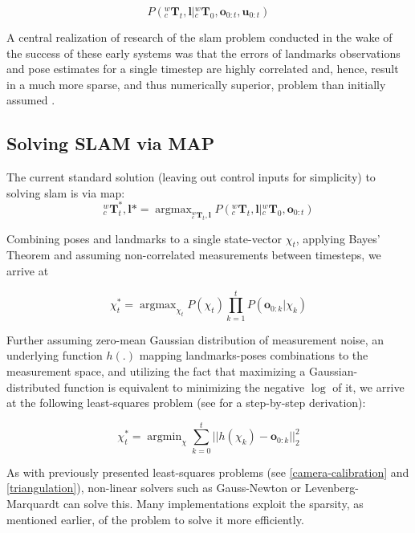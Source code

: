\documentclass[headsepline, hidelinks, footsepline, footinclude=false, oneside, fontsize=11pt, paper=a4, listof=totoc, bibliography=totoc]{scrbook}
\DeclareMathOperator*{\argmax}{argmax}
\DeclareMathOperator*{\argmin}{argmin}
\begin{document}
\begin{equation}
\label{eq:slam-prob-ctrl-input}
P({}^w_c\mathbf{T}_t, \mathbf{l} | {}^w_c\mathbf{T}_0, \mathbf{o}_{0:t}, \mathbf{u}_{0:t})
\end{equation}

A central realization of research of the \gls{slam} problem conducted in the wake of the success of these early systems was that the errors of landmarks observations and pose estimates for a single timestep 
are highly correlated and, hence, result in a much more sparse, and thus numerically superior, problem than initially assumed \cite{cadenaPresentFutureSimultaneous2016}. 

\subsection{Solving SLAM via MAP}
\label{sec:orgc0908ab}
The current standard solution (leaving out control inputs for simplicity) to solving \gls{slam} is via \gls{map}:
\begin{equation}
\label{eq:slam-map}
{}^w_c\mathbf{T}_t^*, \mathbf{l}* = \argmax_{{}^w_c\mathbf{T}_t, \mathbf{l}} P({}^w_c\mathbf{T}_t, \mathbf{l} | {}^w_c\mathbf{T}_0, \mathbf{o}_{0:t})
\end{equation}

Combining poses and landmarks to a single state-vector \(\chi_t\), applying Bayes' Theorem and assuming non-correlated measurements between timesteps, we arrive at 

\begin{equation}
\label{eq:slam-map-2}
\chi_t^* = \argmax_{\chi_t} P(\chi_t) \prod_{k=1}^{t}P(\mathbf{o}_{0:k} | \chi_k)
\end{equation}

Further assuming zero-mean Gaussian distribution of measurement noise, an underlying function \(h(.)\) mapping landmarks-poses combinations to the measurement space, and utilizing the fact that
maximizing a Gaussian-distributed function is equivalent to minimizing the negative \(\log\) of it, we arrive at the following least-squares problem (see \cite{cadenaPresentFutureSimultaneous2016} for a step-by-step derivation):

\begin{equation}
\label{eq:slam-map-ls}
\chi_t^* = \argmin_{\chi} \sum_{k=0}^t||h(\chi_k) - \mathbf{o}_{0:k}||_2^2
\end{equation}

As with previously presented least-squares problems (see \cref{camera-calibration} and \cref{triangulation}), non-linear solvers such as Gauss-Newton or Levenberg-Marquardt can solve this.
Many implementations exploit the sparsity, as mentioned earlier, of the problem to solve it more efficiently.
\end{document}

